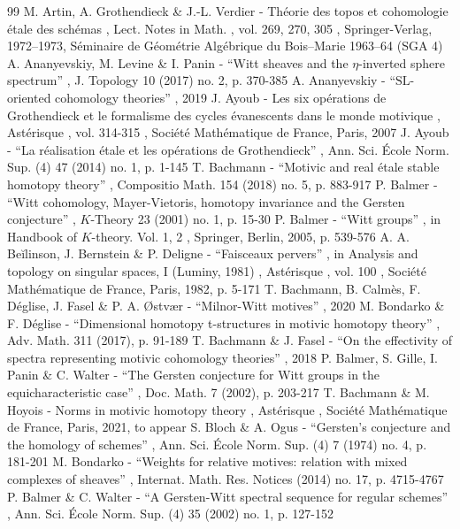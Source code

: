 \documentclass[11pt]{article}
\numberwithin{equation}{section}\renewcommand{\encodingdefault}{TU}
\theoremstyle{remark}
\theoremstyle{definition}
\numberwithin{equation}{thm}
\begin{document}
\begin{thebibliography}{99}
 M. Artin, A. Grothendieck \& J.-L. Verdier - Théorie des topos et cohomologie étale des schémas , Lect. Notes in Math. , vol. 269, 270, 305 , Springer-Verlag, 1972–1973, Séminaire de Géométrie Algébrique du Bois–Marie 1963–64 (SGA 4)
 A. Ananyevskiy, M. Levine \& I. Panin - “Witt sheaves and the $\eta $-inverted sphere spectrum” , J. Topology 10 (2017) no. 2, p. 370-385
 A. Ananyevskiy - “$\mathrm{SL}$-oriented cohomology theories” , 2019
 J. Ayoub - Les six opérations de Grothendieck et le formalisme des cycles évanescents dans le monde motivique , Astérisque , vol. 314-315 , Société Mathématique de France, Paris, 2007
 J. Ayoub - “La réalisation étale et les opérations de Grothendieck” , Ann. Sci. École Norm. Sup. (4) 47 (2014) no. 1, p. 1-145
 T. Bachmann - “Motivic and real étale stable homotopy theory” , Compositio Math. 154 (2018) no. 5, p. 883-917
 P. Balmer - “Witt cohomology, Mayer-Vietoris, homotopy invariance and the Gersten conjecture” , $K$-Theory 23 (2001) no. 1, p. 15-30
 P. Balmer - “Witt groups” , in Handbook of $K$-theory. Vol. 1, 2 , Springer, Berlin, 2005, p. 539-576
 A. A. Beĭlinson, J. Bernstein \& P. Deligne - “Faisceaux pervers” , in Analysis and topology on singular spaces, I (Luminy, 1981) , Astérisque , vol. 100 , Société Mathématique de France, Paris, 1982, p. 5-171
 T. Bachmann, B. Calmès, F. Déglise, J. Fasel \& P. A. Østvær - “Milnor-Witt motives” , 2020
 M. Bondarko \& F. Déglise - “Dimensional homotopy t-structures in motivic homotopy theory” , Adv. Math. 311 (2017), p. 91-189
 T. Bachmann \& J. Fasel - “On the effectivity of spectra representing motivic cohomology theories” , 2018
 P. Balmer, S. Gille, I. Panin \& C. Walter - “The Gersten conjecture for Witt groups in the equicharacteristic case” , Doc. Math. 7 (2002), p. 203-217
 T. Bachmann \& M. Hoyois - Norms in motivic homotopy theory , Astérisque , Société Mathématique de France, Paris, 2021, to appear
 S. Bloch \& A. Ogus - “Gersten’s conjecture and the homology of schemes” , Ann. Sci. École Norm. Sup. (4) 7 (1974) no. 4, p. 181-201
 M. Bondarko - “Weights for relative motives: relation with mixed complexes of sheaves” , Internat. Math. Res. Notices (2014) no. 17, p. 4715-4767
 P. Balmer \& C. Walter - “A Gersten-Witt spectral sequence for regular schemes” , Ann. Sci. École Norm. Sup. (4) 35 (2002) no. 1, p. 127-152

\end{thebibliography}
\end{document}
